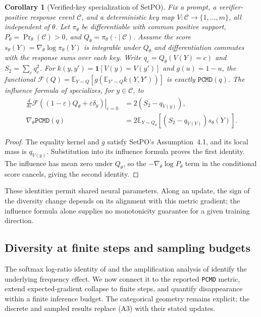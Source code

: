 \documentclass{article}
\newcommand{\enforcehalffinalproseline}{%
  \setlength{\parfillskip}{0pt plus .20\linewidth}}
\newcommand{\1}{\mathbf 1}
\newcommand{\E}{\mathbb E}
\newcommand{\pmd}{\texttt{PCMD}}
\newtheorem{corollary}[lemma]{Corollary}
\theoremstyle{remark}
\theoremstyle{definition}
\theoremstyle{plain}
\begin{document}
\begin{corollary}[Verified-key specialization of SetPO]
\enforcehalffinalproseline
\label{cor:pcmd-setpo-neural}
Fix a prompt, a verifier-positive response event $\mathcal C$, and a
deterministic key map $V:\mathcal C\to\{1,\ldots,m\}$, all independent
of $\theta$. Let $\pi_\theta$ be differentiable with common positive support,
$P_\theta=\Pr_\theta(\mathcal C)>0$, and
$Q_\theta=\pi_\theta(\cdot\mid\mathcal C)$. Assume the score
$s_\theta(Y)=\nabla_\theta\log\pi_\theta(Y)$ is integrable under $Q_\theta$
and differentiation commutes with the response sums over each key.
Write $q_c=Q_\theta(V(Y)=c)$ and $S_2=\sum_cq_c^2$.
For $k(y,y')=\1[V(y)=V(y')]$ and $g(u)=1-u$, the functional
$\mathcal F(Q)=\E_{Y\sim Q}[g(\E_{Y'\sim Q}k(Y,Y'))]$ is exactly
$\pmd(q)$. The influence formula of
\citet[Theorem~4.2, v1]{li2026setpo} specializes, for $y\in\mathcal C$, to
\begin{align}
 \left.\frac{d}{d\varepsilon}
  \mathcal F((1-\varepsilon)Q_\theta+\varepsilon\delta_y)
  \right|_{\varepsilon=0}
 &=2(S_2-q_{V(y)}),\label{eq:pcmd-setpo-influence}\\
 \nabla_\theta\pmd(q)
 &=2\E_{Y\sim Q_\theta}
       [(S_2-q_{V(Y)})s_\theta(Y)].
 \label{eq:pcmd-neural-gradient}
\end{align}
\end{corollary}
\begin{proof}
\enforcehalffinalproseline
The equality kernel and $g$ satisfy SetPO's Assumption~4.1, and its local
mass is $q_{V(y)}$. Substitution into its influence formula proves the first
identity. The influence has mean zero under $Q_\theta$, so the
$-\nabla_\theta\log P_\theta$ term in the conditional score cancels,
giving the second identity.
\end{proof}
These identities permit shared neural parameters. Along an update, the
sign of the diversity change depends on its alignment with this metric
gradient; the influence formula alone supplies no monotonicity guarantee
for a given training direction.

\subsection{Diversity at finite steps and sampling budgets}
\label{app:finite-time-diversity}

The softmax log-ratio identity of
\citet[Theorem~3.1 and App.~A.1]{sinha2026expected} and the amplification
analysis of \citet[Section~4.2]{lochab2026ucpo} identify the underlying
frequency effect. We now connect it to the reported \pmd{} metric, extend
expected-gradient collapse to finite steps, and quantify disappearance within
a finite inference budget. The categorical geometry remains explicit;
the discrete and sampled results replace (A3) with their stated updates.
\end{document}
